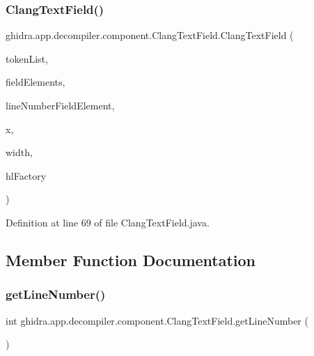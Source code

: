 \subsubsection{\texorpdfstring{ClangTextField()}{ClangTextField()}}
{\footnotesize\ttfamily ghidra.\+app.\+decompiler.\+component.\+Clang\+Text\+Field.\+Clang\+Text\+Field (\begin{DoxyParamCaption}\item[{\mbox{\hyperlink{xml_8hh_ab5ab62f46b3735557c125f91b40ac155}{List}}$<$ \mbox{\hyperlink{classghidra_1_1app_1_1decompiler_1_1_clang_token}{Clang\+Token}} $>$}]{token\+List,  }\item[{Field\+Element \mbox{[}$\,$\mbox{]}}]{field\+Elements,  }\item[{Field\+Element}]{line\+Number\+Field\+Element,  }\item[{int}]{x,  }\item[{int}]{width,  }\item[{Highlight\+Factory}]{hl\+Factory }\end{DoxyParamCaption})\hspace{0.3cm}{\ttfamily [inline]}}



Definition at line 69 of file Clang\+Text\+Field.\+java.



\subsection{Member Function Documentation}
\mbox{\label{classghidra_1_1app_1_1decompiler_1_1component_1_1_clang_text_field_a65931a7169f50132ca1b56ec4eb7dd4c}} 
\subsubsection{\texorpdfstring{getLineNumber()}{getLineNumber()}}
{\footnotesize\ttfamily int ghidra.\+app.\+decompiler.\+component.\+Clang\+Text\+Field.\+get\+Line\+Number (\begin{DoxyParamCaption}{ }\end{DoxyParamCaption})\hspace{0.3cm}{\ttfamily [inline]}}



